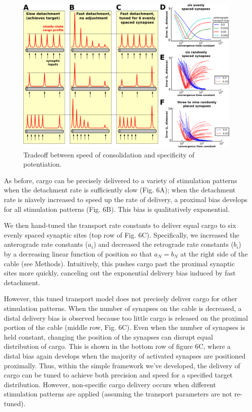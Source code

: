 \documentclass[10pt]{wlpeerj}
\begin{document}
\begin{figure}[!htbp]
\begin{center}
\includegraphics[width=0.9\columnwidth]{06_heterosynaptic_cable.png}
\caption{Tradeoff between speed of consolidation and specificity of potentiation.}
\end{center}
\end{figure}

As before, cargo can be precisely delivered to a variety of stimulation patterns when the detachment rate is sufficiently slow (Fig. 6A); when the detachment rate is n\"iavely increased to speed up the rate of delivery, a proximal bias develops for all stimulation patterns (Fig. 6B). This bias is qualitatively exponential.

We then hand-tuned the transport rate constants to deliver equal cargo to six evenly spaced synaptic sites (top row of Fig. 6C).
Specifically, we increased the anterograde rate constants ($a_i$) and decreased the retrograde rate constants ($b_i$) by a decreasing linear function of position so that $a_N = b_N$ at the right side of the cable (see Methods).
Intuitively, this pushes cargo past the proximal synaptic sites more quickly, canceling out the exponential delivery bias induced by fast detachment.

However, this tuned transport model does not precisely deliver cargo for other stimulation patterns.
When the number of synapses on the cable is decreased, a distal delivery bias is observed because too little cargo is released on the proximal portion of the cable (middle row, Fig. 6C).
Even when the number of synapses is held constant, changing the position of the synapses can disrupt equal distribution of cargo. This is shown in the bottom row of figure 6C, where a distal bias again develops when the majority of activated synapses are positioned proximally.
Thus, within the simple framework we've developed, the delivery of cargo can be tuned to achieve both precision and speed for a specified target distribution.
However, non-specific cargo delivery occurs when different stimulation patterns are applied (assuming the transport parameters are not re-tuned).
\end{document}
